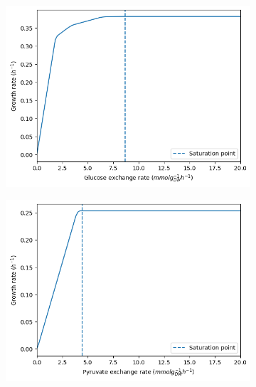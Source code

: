 \begin{figure}[hbp!]
  \centering
  \begin{subfigure}[t]{0.45\textwidth}
  \centering
    \includegraphics[width=\linewidth]{saturation_glc}
    \caption{
    }
    \label{fig:model-saturation-glucose}
  \end{subfigure}%
  \begin{subfigure}[t]{0.45\textwidth}
  \centering
    \includegraphics[width=\linewidth]{saturation_pyr}
    \caption{
    }
    \label{fig:model-saturation-pyruvate}
  \end{subfigure}


\end{figure}
